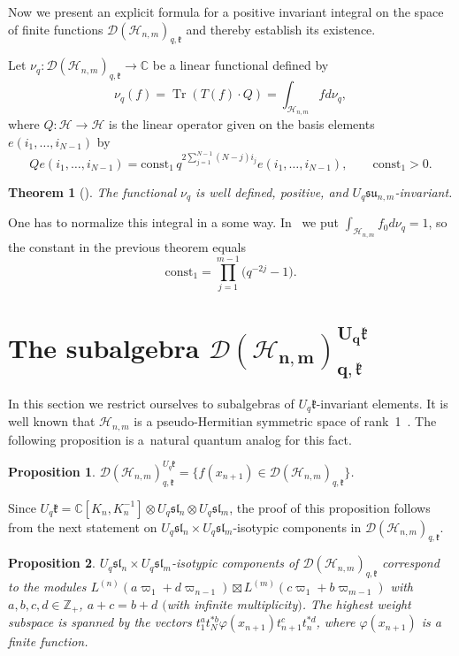 \documentclass[11pt]{article}
\newtheorem{theorem}{Theorem}
\newtheorem{proposition}{Proposition}
\begin{document}
Now we present an explicit formula for a positive invariant integral on the space of f\/inite functions
$\mathscr{D}(\mathscr{H}_{n,m})_{q,\mathfrak{k}}$ and thereby establish its existence.

Let $\nu_q:\mathscr{D}(\mathscr{H}_{n,m})_{q,\mathfrak{k}} \to\mathbb{C}$ be a linear functional def\/ined by
\[
\nu_q(f)=\operatorname{Tr}(T(f)\cdot Q)=\int_{\mathscr{H}_{n,m}} fd\nu_q,
\]
where $Q:\mathscr{H}\to\mathscr{H}$ is the linear operator given on the basis elements
$e(i_1,\ldots,i_{N-1})$ by
\[
Qe(i_1,\ldots,i_{N-1})= \mathrm{const_1} \, q^{2\sum\limits_{j=1}^{N-1}(N-j)i_j}e(i_1,\ldots,i_{N-1}),
\qquad \mathrm{const_1}>0.
\]

\begin{theorem}[]
The functional $\nu_q$ is well defined, positive, and $U_{q}\mathfrak{su}_{n,m}$-invariant.
\end{theorem}

One has to normalize this integral in a some way. In~\cite{BS} we put $\int_{\mathscr{H}_{n,m}} f_0
d\nu_q=1$, so the constant in the previous theorem equals
\[
\mathrm{const_1}= \prod\limits_{j=1}^{m-1}\big(q^{-2j}-1\big).
\]



\section[The subalgebra $\mathscr{D}(\mathscr{H}_{n,m})_{q,\mathfrak{k}}^{U_q \mathfrak{k}}$]{The subalgebra $\boldsymbol{\mathscr{D}(\mathscr{H}_{n,m})_{q,\mathfrak{k}}^{U_q \mathfrak{k}}}$}\label{sec_4}

In this section we restrict ourselves to subalgebras of $U_q \mathfrak k$-invariant elements. It is well
known that $\mathscr{H}_{n,m}$ is a pseudo-Hermitian symmetric space of rank~1~\cite{Molch2}. The following
proposition is a~natural quantum analog for this fact.

\begin{proposition}
$\mathscr{D}(\mathscr{H}_{n,m})_{q,\mathfrak{k}}^{U_q \mathfrak{k}}=\{f(x_{n+1}) \in
\mathscr{D}(\mathscr{H}_{n,m})_{q,\mathfrak{k}}\}$.
\end{proposition}
Since $U_q \mathfrak{k}=\mathbb C[K_n,K_n^{-1}] \otimes U_q \mathfrak{sl}_n \otimes U_q \mathfrak{sl}_m$, the
proof of this proposition follows from the next statement on $U_q \mathfrak{sl}_n \times U_q
\mathfrak{sl}_m$-isotypic components in $\mathscr{D}(\mathscr{H}_{n,m})_{q,\mathfrak{k}}$.
\begin{proposition}
$U_q \mathfrak{sl}_n \times U_q \mathfrak{sl}_m$-isotypic components of
$\mathscr{D}(\mathscr{H}_{n,m})_{q,\mathfrak{k}}$ correspond to the modules $L^{(n)}(a\varpi_1+d\varpi_{n-1})
\boxtimes L^{(m)}(c\varpi_1 +b \varpi_{m-1})$ with $a,b,c,d \in \mathbb Z_+$, $a+c=b+d$ $($with infinite
multiplicity$)$. The highest weight subspace is spanned by the vectors
$t_1^at_N^{*b}\varphi(x_{n+1})t_{n+1}^ct_n^{*d}$, where $\varphi(x_{n+1})$ is a finite function.
\end{proposition}
\end{document}
